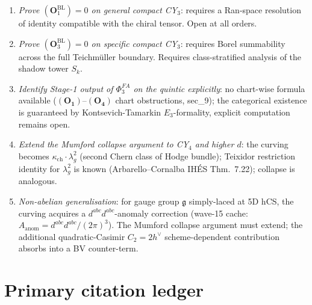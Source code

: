 \documentclass[11pt]{amsart}
\newcommand{\kch}{\kappa_{\mathrm{ch}}}
\begin{document}
\begin{enumerate}[leftmargin=2em]
\item \emph{Prove $(\mathbf{O}_1^{\mathrm{BL}}) = 0$ on general
compact CY$_3$}: requires a Ran-space resolution of identity
compatible with the chiral tensor. Open at all orders.
\item \emph{Prove $(\mathbf{O}_3^{\mathrm{BL}}) = 0$ on specific
compact CY$_3$}: requires Borel summability across the full
Teichmüller boundary. Requires class-stratified analysis of
the shadow tower $S_k$.
\item \emph{Identify Stage-1 output of $\Phi^{FA}_3$ on the
quintic explicitly}: no chart-wise formula available
($(\mathbf{O_1})$--$(\mathbf{O_4})$ chart obstructions, sec\_9);
the categorical existence is guaranteed by Kontsevich-Tamarkin
$E_3$-formality, explicit computation remains open.
\item \emph{Extend the Mumford collapse argument to CY$_4$ and higher
$d$}: the curving becomes $\kch \cdot \lambda_g^2$
(second Chern class of Hodge bundle); Teixidor restriction
identity for $\lambda_g^2$ is known (Arbarello--Cornalba IHÉS
Thm.~7.22); collapse is analogous.
\item \emph{Non-abelian generalisation}: for gauge group
$\mathfrak{g}$ simply-laced at 5D hCS, the curving acquires a
$d^{abc} d^{abc}$-anomaly correction (wave-15 cache:
$A_{\mathrm{anom}} = d^{abc} d^{abc}/(2\pi)^3$). The Mumford
collapse argument must extend; the additional quadratic-Casimir
$C_2 = 2h^\vee$ scheme-dependent contribution absorbs into
a BV counter-term.
\end{enumerate}

\section{Primary citation ledger}
\end{document}
